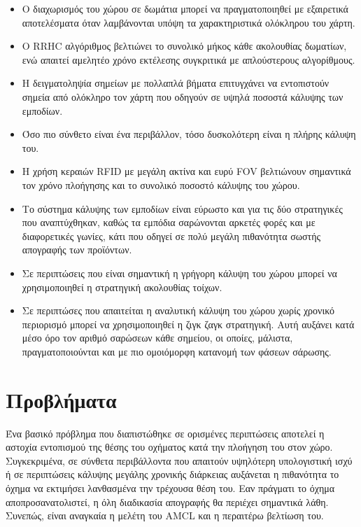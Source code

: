 \begin{itemize}
    \setlength\itemsep{-0.2em}
    \item Ο διαχωρισμός του χώρου σε δωμάτια μπορεί να πραγματοποιηθεί με εξαιρετικά αποτελέσματα όταν λαμβάνονται υπόψη τα χαρακτηριστικά ολόκληρου του χάρτη.
    \item Ο RRHC αλγόριθμος βελτιώνει το συνολικό μήκος κάθε ακολουθίας δωματίων, ενώ απαιτεί αμελητέο χρόνο εκτέλεσης συγκριτικά με απλούστερους αλγορίθμους.
    \item Η δειγματοληψία σημείων με πολλαπλά βήματα επιτυγχάνει να εντοπιστούν σημεία από ολόκληρο τον χάρτη που οδηγούν σε υψηλά ποσοστά κάλυψης των εμποδίων.
    \item Όσο πιο σύνθετο είναι ένα περιβάλλον, τόσο δυσκολότερη είναι η πλήρης κάλυψη του.
    \item Η χρήση κεραιών RFID με μεγάλη ακτίνα και ευρύ FOV βελτιώνουν σημαντικά τον χρόνο πλοήγησης και το συνολικό ποσοστό κάλυψης του χώρου.
    \item Το σύστημα κάλυψης των εμποδίων είναι εύρωστο και για τις δύο στρατηγικές που αναπτύχθηκαν, καθώς τα εμπόδια σαρώνονται αρκετές φορές και με διαφορετικές γωνίες, κάτι που οδηγεί σε πολύ μεγάλη πιθανότητα σωστής απογραφής των προϊόντων.
    \item Σε περιπτώσεις που είναι σημαντική η γρήγορη κάλυψη του χώρου μπορεί να χρησιμοποιηθεί η στρατηγική ακολουθίας τοίχων. 
    \item Σε περιπτώσες που απαιτείται η αναλυτική κάλυψη του χώρου χωρίς χρονικό περιορισμό μπορεί να χρησιμοποιηθεί η ζιγκ ζαγκ στρατηγική. Αυτή αυξάνει κατά μέσο όρο τον αριθμό σαρώσεων κάθε σημείου, οι οποίες, μάλιστα, πραγματοποιούνται και με πιο ομοιόμορφη κατανομή των φάσεων σάρωσης.
\end{itemize}


\section{Προβλήματα}

Ένα βασικό πρόβλημα που διαπιστώθηκε σε ορισμένες περιπτώσεις αποτελεί η αστοχία εντοπισμού της θέσης του οχήματος κατά την πλοήγηση του στον χώρο. Συγκεκριμένα, σε σύνθετα  περιβάλλοντα που απαιτούν υψηλότερη υπολογιστική ισχύ ή σε περιπτώσεις κάλυψης μεγάλης χρονικής διάρκειας αυξάνεται η πιθανότητα το όχημα να εκτιμήσει λανθασμένα την τρέχουσα θέση του. Εαν πράγματι το όχημα αποπροσανατολιστεί, η όλη διαδικασία απογραφής θα περιέχει σημαντικά λάθη. Συνεπώς, είναι αναγκαία η μελέτη του AMCL και η περαιτέρω βελτίωση του. 

